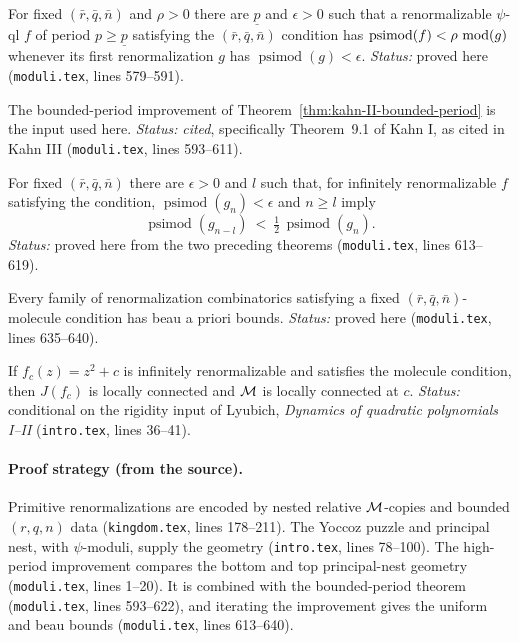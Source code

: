 \begin{theorem}
\label{thm:kahn-III-moduli}
For fixed $(\bar r,\bar q,\bar n)$ and $\rho>0$ there are $\underline p$ and $\epsilon>0$ such that
a renormalizable $\psi$-ql $f$ of period $p\ge\underline p$ satisfying the $(\bar r,\bar q,\bar n)$
condition has $\operatorname{psimod}(f)<\rho\,\operatorname{mod}(g)$ whenever its first renormalization $g$
has $\operatorname{psimod}(g)<\epsilon$.  \emph{Status:} proved here (\texttt{moduli.tex}, lines 579--591).
\end{theorem}

\begin{theorem}
\label{thm:kahn-III-bounded}
The bounded-period improvement of Theorem~\ref{thm:kahn-II-bounded-period} is the input used here.
\emph{Status:} \emph{cited}, specifically Theorem~9.1 of Kahn I, as cited in Kahn III
(\texttt{moduli.tex}, lines 593--611).
\end{theorem}

\begin{theorem}[Corollary 6.3]
\label{thm:kahn-III-decay}
For fixed $(\bar r,\bar q,\bar n)$ there are $\epsilon>0$ and $l$ such that, for infinitely
renormalizable $f$ satisfying the condition, $\operatorname{psimod}(g_n)<\epsilon$ and $n\ge l$ imply
\[
\operatorname{psimod}(g_{n-l})\ <\ \tfrac12\,\operatorname{psimod}(g_n).
\]
\emph{Status:} proved here from the two preceding theorems (\texttt{moduli.tex}, lines 613--619).
\end{theorem}

\begin{theorem}
\label{thm:kahn-III-beau}
Every family of renormalization combinatorics satisfying a fixed $(\bar r,\bar q,\bar n)$-molecule
condition has beau a priori bounds.  \emph{Status:} proved here (\texttt{moduli.tex}, lines 635--640).
\end{theorem}

\begin{theorem}
\label{thm:kahn-III-mlc}
If $f_c(z)=z^2+c$ is infinitely renormalizable and satisfies the molecule condition, then $J(f_c)$ is
locally connected and $\mathcal M$ is locally connected at $c$.  \emph{Status:} conditional on the rigidity
input of Lyubich, \emph{Dynamics of quadratic polynomials I--II} (\texttt{intro.tex}, lines 36--41).
\end{theorem}

\paragraph{Proof strategy (from the source).}
Primitive renormalizations are encoded by nested relative $\mathcal M$-copies and bounded $(r,q,n)$ data
(\texttt{kingdom.tex}, lines 178--211).  The Yoccoz puzzle and principal nest, with $\psi$-moduli,
supply the geometry (\texttt{intro.tex}, lines 78--100).  The high-period improvement compares the
bottom and top principal-nest geometry (\texttt{moduli.tex}, lines 1--20).  It is combined with the
bounded-period theorem (\texttt{moduli.tex}, lines 593--622), and iterating the improvement gives the
uniform and beau bounds (\texttt{moduli.tex}, lines 613--640).

